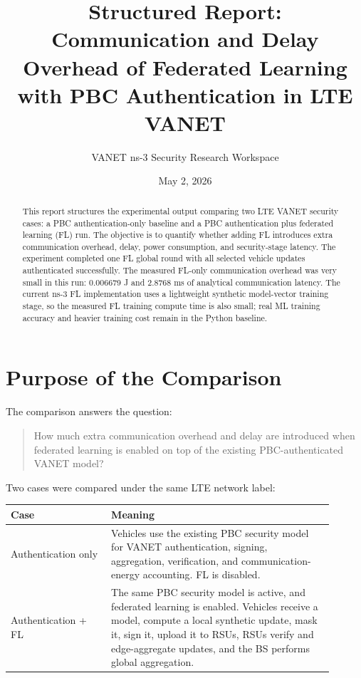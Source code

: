 \documentclass[11pt,a4paper]{article}
\title{Structured Report: Communication and Delay Overhead of Federated Learning with PBC Authentication in LTE VANET}
\author{VANET ns-3 Security Research Workspace}
\date{May 2, 2026}
\begin{document}
\maketitle

\begin{abstract}
This report structures the experimental output comparing two LTE VANET security
cases: a PBC authentication-only baseline and a PBC authentication plus
federated learning (FL) run. The objective is to quantify whether adding FL
introduces extra communication overhead, delay, power consumption, and
security-stage latency. The experiment completed one FL global round with all
selected vehicle updates authenticated successfully. The measured FL-only
communication overhead was very small in this run: 0.006679 J and 2.8768 ms of
analytical communication latency. The current ns-3 FL implementation uses a
lightweight synthetic model-vector training stage, so the measured FL training
compute time is also small; real ML training accuracy and heavier training cost
remain in the Python baseline.
\end{abstract}

\tableofcontents
\newpage

\section{Purpose of the Comparison}

The comparison answers the question:

\begin{quote}
How much extra communication overhead and delay are introduced when federated
learning is enabled on top of the existing PBC-authenticated VANET model?
\end{quote}

Two cases were compared under the same LTE network label:

\begin{longtable}{p{0.28\linewidth}p{0.62\linewidth}}
\toprule
\textbf{Case} & \textbf{Meaning} \\
\midrule
Authentication only & Vehicles use the existing PBC security model for VANET authentication, signing, aggregation, verification, and communication-energy accounting. FL is disabled. \\
Authentication + FL & The same PBC security model is active, and federated learning is enabled. Vehicles receive a model, compute a local synthetic update, mask it, sign it, upload it to RSUs, RSUs verify and edge-aggregate updates, and the BS performs global aggregation. \\
\bottomrule
\end{longtable}
\end{document}
